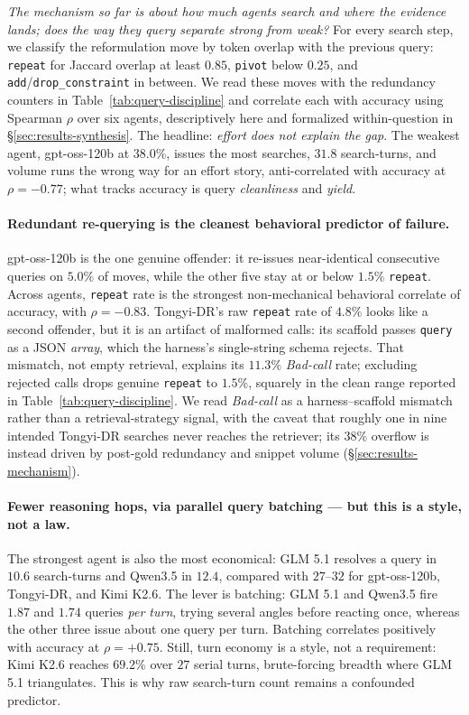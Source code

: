 \emph{The mechanism so far is about how much agents search and where the evidence lands; does the way they query separate strong from weak?} For every search step, we classify the reformulation move by token overlap with the previous query: \texttt{repeat} for Jaccard overlap at least $0.85$, \texttt{pivot} below $0.25$, and \texttt{add}/\texttt{drop\_constraint} in between. We read these moves with the redundancy counters in Table~\ref{tab:query-discipline} and correlate each with accuracy using Spearman $\rho$ over six agents, descriptively here and formalized within-question in §\ref{sec:results-synthesis}. The headline: \emph{effort does not explain the gap}. The weakest agent, gpt-oss-120b at $38.0\%$, issues the most searches, $31.8$ search-turns, and volume runs the wrong way for an effort story, anti-correlated with accuracy at $\rho = -0.77$; what tracks accuracy is query \emph{cleanliness} and \emph{yield}.

\paragraph{Redundant re-querying is the cleanest behavioral predictor of failure.} gpt-oss-120b is the one genuine offender: it re-issues near-identical consecutive queries on $5.0\%$ of moves, while the other five stay at or below $1.5\%$ \texttt{repeat}. Across agents, \texttt{repeat} rate is the strongest non-mechanical behavioral correlate of accuracy, with $\rho = -0.83$. Tongyi-DR's raw \texttt{repeat} rate of $4.8\%$ looks like a second offender, but it is an artifact of malformed calls: its scaffold passes \texttt{query} as a JSON \emph{array}, which the harness's single-string schema rejects. That mismatch, not empty retrieval, explains its $11.3\%$ \emph{Bad-call} rate; excluding rejected calls drops genuine \texttt{repeat} to $1.5\%$, squarely in the clean range reported in Table~\ref{tab:query-discipline}. We read \emph{Bad-call} as a harness--scaffold mismatch rather than a retrieval-strategy signal, with the caveat that roughly one in nine intended Tongyi-DR searches never reaches the retriever; its $38\%$ overflow is instead driven by post-gold redundancy and snippet volume (§\ref{sec:results-mechanism}).

\paragraph{Fewer reasoning hops, via parallel query batching --- but this is a style, not a law.} The strongest agent is also the most economical: GLM 5.1 resolves a query in $10.6$ search-turns and Qwen3.5 in $12.4$, compared with $27\text{--}32$ for gpt-oss-120b, Tongyi-DR, and Kimi K2.6. The lever is batching: GLM 5.1 and Qwen3.5 fire $1.87$ and $1.74$ queries \emph{per turn}, trying several angles before reacting once, whereas the other three issue about one query per turn. Batching correlates positively with accuracy at $\rho = +0.75$. Still, turn economy is a style, not a requirement: Kimi K2.6 reaches $69.2\%$ over $27$ serial turns, brute-forcing breadth where GLM 5.1 triangulates. This is why raw search-turn count remains a confounded predictor.

